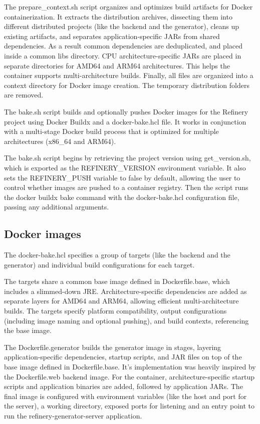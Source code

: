 			The prepare\_context.sh script organizes and optimizes build artifacts for Docker containerization. 
			It extracts the distribution archives, dissecting them into different distributed projects (like the backend and the generator), cleans up existing artifacts, 
			and separates application-specific JARs from shared dependencies. As a result common dependencies are deduplicated, and placed inside a common libs directory. 
			CPU architecture-specific JARs are placed in separate directories for AMD64 and ARM64 architectures. 
			This helps the container supports multi-architecture builds.
			Finally, all files are organized into a context directory for Docker image creation. The temporary distribution folders are removed.

			The bake.sh script builds and optionally pushes Docker images for the Refinery project using Docker Buildx and a docker-bake.hcl file. 
			It works in conjunction with a multi-stage Docker build process that is optimized for multiple architectures (x86\_64 and ARM64).

			The bake.sh script begins by retrieving the project version using get\_version.sh, which is exported as the REFINERY\_VERSION environment variable. 
			It also sets the REFINERY\_PUSH variable to false by default, allowing the user to control whether images are pushed to a container registry. 
			Then the script runs the docker buildx bake command with the docker-bake.hcl configuration file, 
			passing any additional arguments.


		\subsection{Docker images}
			The docker-bake.hcl specifies a group of targets (like the backend and the generator) and individual build configurations for each target. 

			The targets share a common base image defined in Dockerfile.base, which includes a slimmed-down JRE. 
			Architecture-specific dependencies are added as separate layers for AMD64 and ARM64, allowing efficient multi-architecture builds. 
			The targets specify platform compatibility, output configurations (including image naming and optional pushing), 
			and build contexts, referencing the base image.

			The Dockerfile.generator builds the generator image in stages, layering application-specific dependencies, startup scripts, 
			and JAR files on top of the base image defined in Dockerfile.base. It's implementation was heavily inspired by the Dockerfile.web backend image. 
			For the container, architecture-specific startup scripts and application binaries are added, 
			followed by application JARs. The final image is configured with environment variables (like the host and port for the server),
			a working directory, exposed ports for listening and an entry point to run the refinery-generator-server application.


